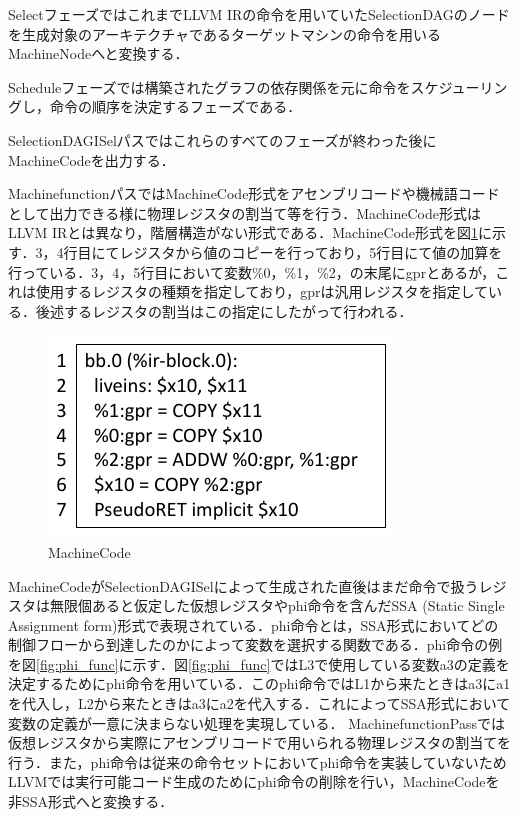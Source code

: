 SelectフェーズではこれまでLLVM IRの命令を用いていたSelectionDAGのノードを生成対象のアーキテクチャであるターゲットマシンの命令を用いるMachineNodeへと変換する．

Scheduleフェーズでは構築されたグラフの依存関係を元に命令をスケジューリングし，命令の順序を決定するフェーズである．

SelectionDAGISelパスではこれらのすべてのフェーズが終わった後にMachineCodeを出力する．

MachinefunctionパスではMachineCode形式をアセンブリコードや機械語コードとして出力できる様に物理レジスタの割当て等を行う．MachineCode形式はLLVM IRとは異なり，階層構造がない形式である．MachineCode形式を図\ref{fig:machine_code}に示す．3，4行目にてレジスタから値のコピーを行っており，5行目にて値の加算を行っている．3，4，5行目において変数\%0，\%1，\%2，の末尾にgprとあるが，これは使用するレジスタの種類を指定しており，gprは汎用レジスタを指定している．後述するレジスタの割当はこの指定にしたがって行われる．

\begin{figure}
    \centering
    \includegraphics[scale=1.0]{image/machine_code.pdf}
    \caption{MachineCode}
    \label{fig:machine_code}
\end{figure}

MachineCodeがSelectionDAGISelによって生成された直後はまだ命令で扱うレジスタは無限個あると仮定した仮想レジスタやphi命令を含んだSSA (Static Single Assignment form)形式で表現されている．phi命令とは，SSA形式においてどの制御フローから到達したのかによって変数を選択する関数である．phi命令の例を図\ref{fig:phi_func}に示す．図\ref{fig:phi_func}ではL3で使用している変数a3の定義を決定するためにphi命令を用いている．このphi命令ではL1から来たときはa3にa1を代入し，L2から来たときはa3にa2を代入する．これによってSSA形式において変数の定義が一意に決まらない処理を実現している．
MachinefunctionPassでは仮想レジスタから実際にアセンブリコードで用いられる物理レジスタの割当てを行う．また，phi命令は従来の命令セットにおいてphi命令を実装していないためLLVMでは実行可能コード生成のためにphi命令の削除を行い，MachineCodeを非SSA形式へと変換する．

